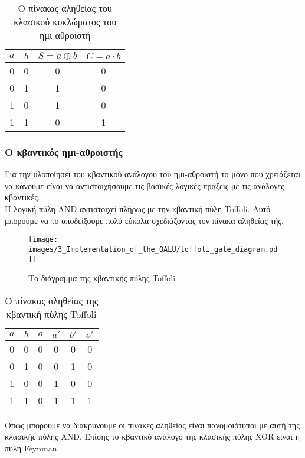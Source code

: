\begin{table}[ht]
    \centering
    \begin{tabular}{c c|c c}
        $a$ & $b$ & $S = a \oplus b$ & $C = a \cdot b$ \\
        \hline
        0 & 0 & 0 & 0 \\
        0 & 1 & 1 & 0 \\
        1 & 0 & 1 & 0 \\
        1 & 1 & 0 & 1 \\
    \end{tabular}
    \label{tab:truth_table_halfadder}
    \caption{Ο πίνακας αληθείας του κλασικού κυκλώματος του ημι-αθροιστή}
\end{table}

\subsubsection{Ο κβαντικός ημι-αθροιστής}
Για την υλοποίησει του κβαντικού ανάλογου του ημι-αθροιστή το μόνο που
χρειάζεται να κάνουμε είναι να αντιστοιχήσουμε τις βασικές λογικές πράξεις
με τις ανάλογες κβαντικές.\\
Η λογική πύλη AND αντιστοιχεί πλήρως με την κβαντική πύλη Toffoli. Αυτό μπορούμε
να το αποδείξουμε πολύ εύκολα σχεδιάζοντας τον πίνακα αληθείας τής.

\begin{figure}[ht]
    \centering
    \texttt{[image: images/3\_Implementation\_of\_the\_QALU/toffoli\_gate\_diagram.pdf]}
    \label{fig:toffoli_gate_diagram}
    \caption{Το διάγραμμα της κβαντικής πύλης Toffoli}
\end{figure}

\begin{table}[ht]
    \centering
    \begin{tabular}{c c c|c c c}
        $a$ & $b$ & $o$ & $a'$ & $b'$ & $o'$ \\
        \hline
        0 & 0 & 0 & 0 & 0 & 0 \\
        0 & 1 & 0 & 0 & 1 & 0 \\
        1 & 0 & 0 & 1 & 0 & 0 \\
        1 & 1 & 0 & 1 & 1 & 1 \\
    \end{tabular}
    \label{tab:truth_table_toffoli}
    \caption{Ο πίνακας αληθείας της κβαντική πύλης Toffoli}
\end{table}

Όπως μπορούμε να διακρύνουμε οι πίνακες αληθείας είναι πανομοιότυποι με
αυτή της κλασικής πύλης AND. Επίσης το κβαντικό ανάλογο της κλασικής πύλης
XOR είναι η πύλη Feynman.

